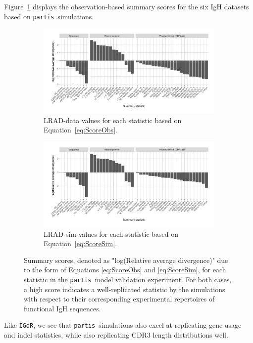\documentclass{article}
\newcommand{\partis}{\texttt{partis}}
\newcommand{\igor}{\texttt{IGoR}}
\begin{document}
Figure~\ref{fig:ObsScoresBCR} displays the observation-based summary scores for the six IgH datasets based on \partis\ simulations.
\begin{figure}
	\begin{subfigure}{\textwidth}
    	\includegraphics[width=\linewidth]{Figures/PartisScores/obs_score_plot.pdf}
    	\caption{LRAD-data values for each statistic based on Equation~\ref{eq:ScoreObs}.}
    	\label{fig:ObsScoresBCR}
	\end{subfigure}
	\begin{subfigure}{\textwidth}
    	\includegraphics[width=\linewidth]{Figures/PartisScores/sim_score_plot.pdf}
    	\caption{LRAD-sim values for each statistic based on Equation~\ref{eq:ScoreSim}.}
    	\label{fig:SimScoresBCR}
	\end{subfigure}
	\caption{Summary scores, denoted as "log(Relative average divergence)" due to the form of Equations \ref{eq:ScoreObs} and \ref{eq:ScoreSim}, for each statistic in the \partis\ model validation experiment. For both cases, a high score indicates a well-replicated statistic by the simulations with respect to their corresponding experimental repertoires of functional IgH sequences.}
\end{figure}
Like \igor, we see that \partis\ simulations also excel at replicating gene usage and indel statistics, while also replicating CDR3 length distributions well.
\end{document}
